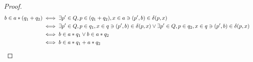 \begin{proof}
    \begin{align*}
        b \in a * (q_1 + q_2) & \iff \exists p' \in Q, p \in (q_1 + q_2), x \in a \ni (p', b) \in \delta(p, x) \\
        & \iff \exists p' \in Q, p \in q_1, x \in q \ni (p', b) \in \delta(p, x) \lor
        \exists p' \in Q, p \in q_2, x \in q \ni (p', b) \in \delta(p, x) \\
        & \iff b \in a * q_1 \lor b \in a * q_2 \\
        & \iff b \in a * q_1 + a * q_2
    \end{align*}
\end{proof}